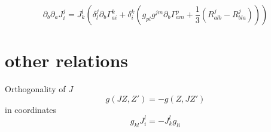 \documentclass[11pt,makeidx]{amsart}%
\numberwithin{equation}{subsection}
\begin{document}
\begin{equation}
\partial_b  \partial_a J_i^j = J^l_k \left(
\delta^j_l \partial_b \Gamma^k_{ai} + \delta^k_i \left(
g_{pl}g^{jm} \partial_b \Gamma^p_{am} +\dfrac{1}{3}\left( 
R^j_{alb} - R^j_{bla}
\right)
\right)
\right)
\end{equation}

\appendix
\bigskip
\section{other relations}
Orthogonality of $J$
\begin{equation}
g(JZ,Z') = -g(Z,JZ')
\end{equation}
in coordinates
\begin{equation}
g_{kl}J^l_i = -J^l_k g_{li}
\end{equation}
\end{document}
